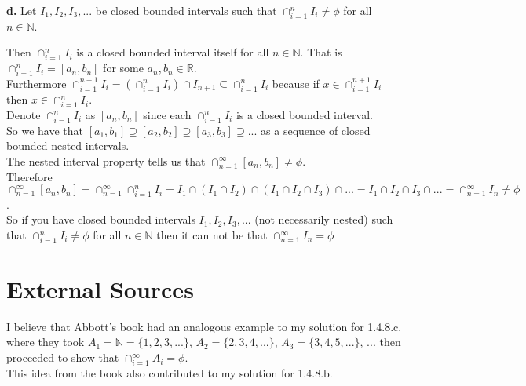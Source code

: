 \documentclass{article}
\begin{document}
{\Large \textbf{d.}} Let $I_1, I_2, I_3, ...$ be closed bounded intervals such that $\cap _{i=1}^n I_i\neq\phi$ for all $n\in\mathbb{N}$.
\begin{center}
    \doublespacing
    Then $\cap _{i=1}^n I_i$ is a closed bounded interval itself for all $n\in\mathbb{N}$. That is $\cap _{i=1}^n I_i = [a_n, b_n]$ for some $a_n, b_n\in\mathbb{R}$.
    \\Furthermore $\cap _{i=1}^{n+1} I_i = (\cap _{i=1}^n I_i)\cap I_{n+1}\subseteq\cap _{i=1}^n I_i$ because if $x\in\cap _{i=1}^{n+1} I_i$ then $x\in\cap _{i=1}^n I_i$.
    \\Denote $\cap _{i=1}^n I_i$ as $[a_n, b_n]$ since each $\cap _{i=1}^n I_i$ is a closed bounded interval.
    \\So we have that $[a_1, b_1]\supseteq [a_2, b_2]\supseteq [a_3, b_3]\supseteq ...$ as a sequence of closed bounded nested intervals.
    \\The nested interval property tells us that $\cap _{n=1}^\infty [a_n, b_n]\neq\phi$.
    \\Therefore $\cap _{n=1}^\infty [a_n, b_n] = \cap _{n=1}^\infty \cap _{i=1}^n I_i = I_1\cap (I_1\cap I_2)\cap (I_1\cap I_2\cap I_3)\cap ... = I_1\cap I_2\cap I_3\cap... = \cap _{n=1}^\infty I_n\neq\phi$.
    \\So if you have closed bounded intervals $I_1, I_2, I_3, ...$ (not necessarily nested) such that $\cap _{i=1}^n I_i\neq\phi$ for all $n\in\mathbb{N}$ then it can not be that $\cap _{n=1}^\infty I_n =\phi$ \qedsymbol
\end{center}

\section*{External Sources}
\doublespacing
\noindent I believe that Abbott's book had an analogous example to my solution for 1.4.8.c. where they took $A_1 =\mathbb{N} = \{1, 2, 3, ...\}$, $A_2 = \{2, 3, 4, ...\}$, $A_3 = \{3, 4, 5, ...\}$, ... then proceeded to show that $\cap _{i=1}^\infty A_i =\phi$.
\\This idea from the book also contributed to my solution for 1.4.8.b.
\end{document}

